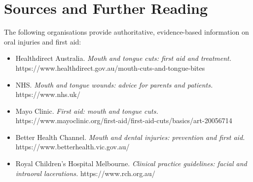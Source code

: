 \section*{Sources and Further Reading}
The following organisations provide authoritative, evidence-based information on oral injuries and first aid:
\begin{itemize}
    \item Healthdirect Australia. \textit{Mouth and tongue cuts: first aid and treatment.} https://www.healthdirect.gov.au/mouth-cuts-and-tongue-bites
    \item NHS. \textit{Mouth and tongue wounds: advice for parents and patients.} https://www.nhs.uk/
    \item Mayo Clinic. \textit{First aid: mouth and tongue cuts.} https://www.mayoclinic.org/first-aid/first-aid-cuts/basics/art-20056714
    \item Better Health Channel. \textit{Mouth and dental injuries: prevention and first aid.} https://www.betterhealth.vic.gov.au/
    \item Royal Children's Hospital Melbourne. \textit{Clinical practice guidelines: facial and intraoral lacerations.} https://www.rch.org.au/
\end{itemize}
